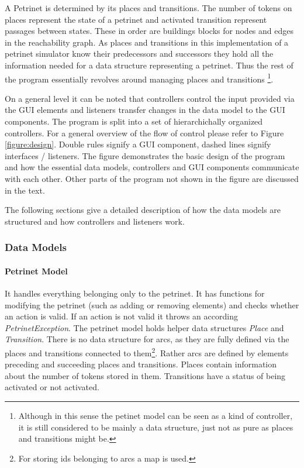 \documentclass[10pt, a4paper]{article}
\begin{document}
A Petrinet is determined by its places and transitions. The number of tokens on places represent the state of a petrinet and activated transition represent passages between states. These in order are buildings blocks for nodes and edges in the reachability graph. As places and transitions in this implementation of a petrinet simulator know their predecessors and successors they hold all the information needed for a data structure representing a petrinet. Thus the rest of the program essentially revolves around managing places and transitions \footnote{Although in this sense the petinet model can be seen as a kind of controller, it is still considered to be mainly a data structure, just not as pure as places and transitions might be.}.

On a general level it can be noted that controllers control the input provided via the GUI elements and listeners transfer changes in the data model to the GUI components. The program is split into a set of hierarchichally organized controllers. For a general overview of the flow of control please refer to Figure \ref{figure:design}. Double rules signify a GUI component, dashed lines signify interfaces / listeners. The figure demonstrates the basic design of the program and how the essential data models, controllers and GUI components communicate with each other. Other parts of the program not shown in the figure are discussed in the text.

The following sections give a detailed description of how the data models are structured and how controllers and listeners work. 



\subsubsection{Data Models}

\paragraph{Petrinet Model} It handles everything belonging only to the petrinet. It has functions for modifying the petrinet (such as adding or removing elements) and checks whether an action is valid. If an action is not valid it throws an according \textit{PetrinetException}. The petrinet model holds helper data structures \textit{Place} and \textit{Transition}. There is no data structure for arcs, as they are fully defined via the places and transitions connected to them\footnote{For storing ids belonging to arcs a map is used.}. Rather arcs are defined by elements preceding and succeeding places and transitions. Places contain information about the number of tokens stored in them. Transitions have a status of being activated or not activated.   
\end{document}
